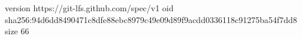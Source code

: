 version https://git-lfs.github.com/spec/v1
oid sha256:94d6dd8490471c8dfe88ebc8979c49e09d89f9acdd0336118c91275ba54f7dd8
size 66
